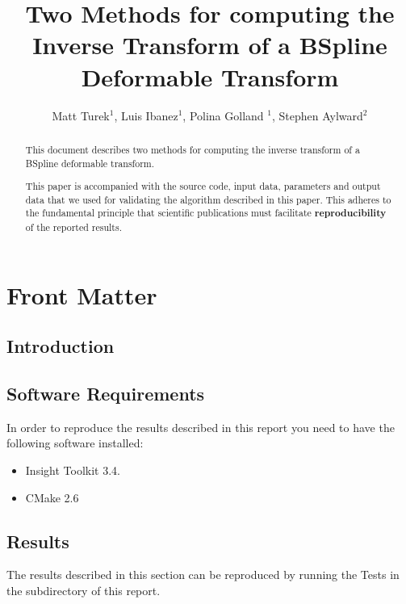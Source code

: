 \documentclass{InsightArticle}
\title{Two Methods for computing the Inverse Transform of a BSpline Deformable
Transform}
\author{Matt Turek$^{1}$, Luis Ibanez$^{1}$, Polina Golland $^{1}$, Stephen Aylward$^{2}$}
\begin{document}
\ifpdf
\else
\fi


\maketitle


\ifhtml
\chapter*{Front Matter\label{front}}
\fi


\begin{abstract}
\noindent
This document describes two methods for computing the inverse transform of a
BSpline deformable transform.

This paper is accompanied with the source code, input data, parameters and
output data that we used for validating the algorithm described in this paper.
This adheres to the fundamental principle that scientific publications must
facilitate \textbf{reproducibility} of the reported results.
\end{abstract}

\tableofcontents

\section{Introduction}


\section{Software Requirements}

In order to reproduce the results described in this report you need to have the
following software installed:

\begin{itemize}
  \item  Insight Toolkit 3.4.
  \item  CMake 2.6
\end{itemize}


\appendix

\section{Results}

The results described in this section can be reproduced by running the Tests in
the  subdirectory of this report.


\end{document}

